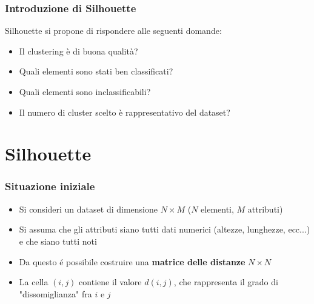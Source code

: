 \documentclass{beamer}
\begin{document}
        \begin{frame}
            \frametitle{Introduzione di Silhouette}
            Silhouette si propone di rispondere alle seguenti domande:

            \begin{itemize}
                \item
                Il clustering è di buona qualità?
                \item
                Quali elementi sono stati ben classificati?
                \item
                Quali elementi sono inclassificabili?
                \item
                Il numero di cluster scelto è rappresentativo del dataset?
            \end{itemize}
        \end{frame}

    \section{Silhouette}

        \begin{frame}
            \frametitle{Situazione iniziale}

            \begin{itemize}
                \item
                Si consideri un dataset di dimensione $N \times M$
                ($N$ elementi, $M$ attributi)
                \item
                Si assuma che gli attributi siano tutti dati numerici
                (altezze, lunghezze, ecc...) e che siano tutti noti
                \item
                Da questo é possibile costruire una \textbf{matrice
                delle distanze} $N \times N$
                \item
                La cella $(i, j)$ contiene il valore $d(i, j)$, che
                rappresenta il grado di "dissomiglianza" fra $i$ e $j$
            \end{itemize}
        \end{frame}
\end{document}
